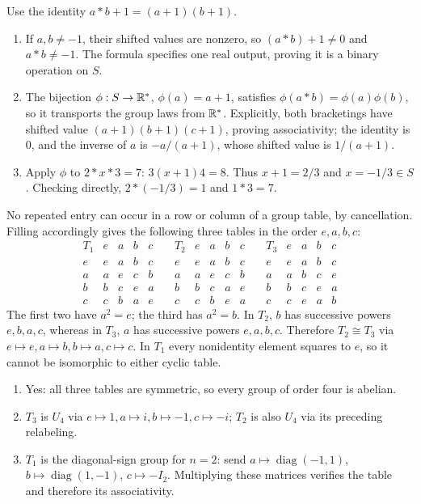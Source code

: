 Use the identity $a*b+1=(a+1)(b+1)$.
\begin{enumerate}[label=(\alph*)]
\item If $a,b\ne-1$, their shifted values are nonzero, so $(a*b)+1\ne0$ and $a*b\ne-1$. The formula specifies one real output, proving it is a binary operation on $S$.
\item The bijection $\phi:S\to\mathbb{R}^*$, $\phi(a)=a+1$, satisfies $\phi(a*b)=\phi(a)\phi(b)$, so it transports the group laws from $\mathbb{R}^*$. Explicitly, both bracketings have shifted value $(a+1)(b+1)(c+1)$, proving associativity; the identity is $0$, and the inverse of $a$ is $-a/(a+1)$, whose shifted value is $1/(a+1)$.
\item Apply $\phi$ to $2*x*3=7$: $3(x+1)4=8$. Thus $x+1=2/3$ and $x=-1/3\in S$. Checking directly, $2*(-1/3)=1$ and $1*3=7$.
\end{enumerate}


No repeated entry can occur in a row or column of a group table, by cancellation. Filling accordingly gives the following three tables in the order $e,a,b,c$:
\[\begin{array}{c|cccc}T_1&e&a&b&c\\\hline e&e&a&b&c\\a&a&e&c&b\\b&b&c&e&a\\c&c&b&a&e\end{array}\quad
\begin{array}{c|cccc}T_2&e&a&b&c\\\hline e&e&a&b&c\\a&a&e&c&b\\b&b&c&a&e\\c&c&b&e&a\end{array}\quad
\begin{array}{c|cccc}T_3&e&a&b&c\\\hline e&e&a&b&c\\a&a&b&c&e\\b&b&c&e&a\\c&c&e&a&b\end{array}\]
The first two have $a^2=e$; the third has $a^2=b$. In $T_2$, $b$ has successive powers $e,b,a,c$, whereas in $T_3$, $a$ has successive powers $e,a,b,c$. Therefore $T_2\cong T_3$ via $e\mapsto e,a\mapsto b,b\mapsto a,c\mapsto c$. In $T_1$ every nonidentity element squares to $e$, so it cannot be isomorphic to either cyclic table.
\begin{enumerate}[label=(\alph*)]
\item Yes: all three tables are symmetric, so every group of order four is abelian.
\item $T_3$ is $U_4$ via $e\mapsto1,a\mapsto i,b\mapsto-1,c\mapsto-i$; $T_2$ is also $U_4$ via its preceding relabeling.
\item $T_1$ is the diagonal-sign group for $n=2$: send $a\mapsto\operatorname{diag}(-1,1)$, $b\mapsto\operatorname{diag}(1,-1)$, $c\mapsto- I_2$. Multiplying these matrices verifies the table and therefore its associativity.
\end{enumerate}

